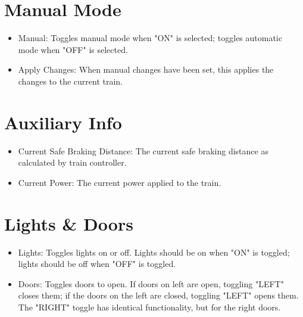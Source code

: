 \documentclass{scrreprt}
\begin{document}
\section{Manual Mode}
\begin{itemize}
	\item Manual: Toggles manual mode when "ON" is selected; toggles automatic mode when "OFF" is selected.
	\item Apply Changes: When manual changes have been set, this applies the changes to the current train.
\end{itemize}

\section{Auxiliary Info}
\begin{itemize}
	\item Current Safe Braking Distance: The current safe braking distance as calculated by train controller.
	\item Current Power: The current power applied to the train.
\end{itemize}

\section{Lights \& Doors}
\begin{itemize}
	\item Lights: Toggles lights on or off.  Lights should be on when "ON" is toggled; lights should be off when "OFF" is toggled.
	\item Doors: Toggles doors to open.  If doors on left are open, toggling "LEFT" closes them; if the doors on the left are closed, toggling "LEFT" opens them.  The "RIGHT" toggle has identical functionality, but for the right doors.
\end{itemize}

\end{document}
